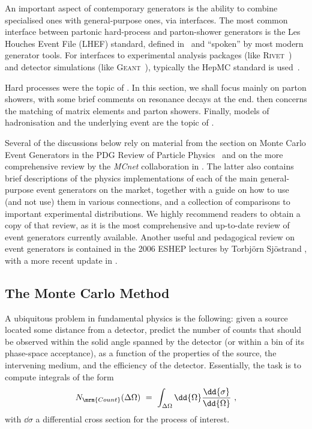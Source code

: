 An important aspect of contemporary generators is the
ability to combine specialised ones with general-purpose ones, via interfaces. 
The most common interface
between partonic hard-process and parton-shower generators is  the
%
%
Les Houches Event File (LHEF) standard, defined
in~\cite{Boos:2001cv,Alwall:2006yp} and ``spoken'' by most modern
generator tools. For interfaces to experimental analysis
packages (like \textsc{Rivet}~\cite{Buckley:2010ar}) 
and detector simulations
(like \textsc{Geant}~\cite{Agostinelli:2002hh}), 
typically the HepMC standard is used~\cite{Dobbs:2001ck}. 

Hard processes were the topic
of . In this section, we shall focus
mainly on parton showers, with some brief comments on resonance
decays at the end. 
 then concerns the matching of matrix elements 
and parton showers. Finally, models of hadronisation and the
underlying event  are the topic of .

Several of the discussions below rely on material from the section on Monte
Carlo Event Generators in the PDG Review of Particle Physics~\cite{pdg2012} and
on the more comprehensive  
%
review by the {\sl MCnet} collaboration 
in \cite{Buckley:2011ms}. The latter also contains brief
descriptions of the  
physics implementations of each of the main general-purpose event
generators on the 
market, together with a guide on how to use (and not use) them 
in various connections, and a collection of comparisons to important
experimental 
distributions. We highly recommend readers to obtain a copy of that
review, as it is the most comprehensive and up-to-date review of event
generators currently available. Another useful and pedagogical review
on event generators is contained in the 2006 ESHEP lectures
by Torbj\"orn Sj\"ostrand \cite{Sjostrand:2006su}, with a more recent update in
\cite{Sjostrand:2009ad}. 

\subsection{The Monte Carlo Method}
A ubiquitous problem in fundamental physics is the following:
given a source located some distance from a detector, predict the
number of counts that should be observed within the solid angle spanned
by the detector (or within a bin of its phase-space acceptance), as a
function of the properties of the source, the intervening medium,
and the efficiency of the detector. Essentially, the task is to
compute integrals of the form
\begin{equation}
N_\mrm{Count}(\Delta\Omega) \ = \ \int_{\Delta \Omega} \dd{\Omega} \frac{\dd{\sigma}}{\dd{\Omega}}~,
\end{equation}
with $\dd{\sigma}$ a differential cross section for the process of
interest. 

